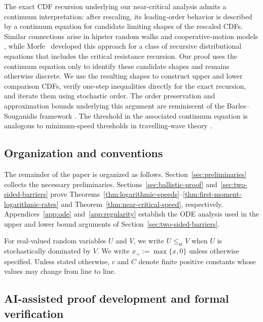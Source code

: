 \documentclass[12pt]{amsart}
\numberwithin{equation}{section}
\theoremstyle{plain}
\theoremstyle{definition}
\newcommand{\stle}{\le_{\mathrm{st}}}
\begin{document}
The exact CDF recursion underlying our near-critical analysis admits a
continuum interpretation: after rescaling, its leading-order behavior is
described by a continuum equation for candidate limiting shapes of the
rescaled CDFs.  Similar connections arise in hipster random walks and
cooperative-motion models
\cite{AddarioBerryEtAl2020,AddarioBerryBeckmanLin2022,
AddarioBerryBeckmanLin2024}, while Morfe~\cite{Morfe2026} developed this
approach for a class of recursive distributional equations that includes the
critical resistance recursion.  Our proof uses
the continuum equation
only to identify these candidate shapes and remains otherwise discrete.  We
use the resulting shapes to construct upper and lower comparison CDFs, verify
one-step inequalities directly for the exact recursion, and iterate them
using stochastic order.  The order preservation and approximation bounds
underlying this argument are reminiscent of the Barles--Souganidis framework
\cite{BarlesSouganidis1991}.  The threshold in the associated continuum
equation is analogous to minimum-speed thresholds in travelling-wave theory
\cite{HadelerRothe1975,SanchezGardunoMaini1994}.

\subsection{Organization and conventions}
\label{sec:organization-conventions}

The remainder of the paper is organized as follows.
Section~\ref{sec:preliminaries} collects the necessary preliminaries.
Sections~\ref{sec:ballistic-proof}
and~\ref{sec:two-sided-barriers} prove
Theorems~\ref{thm:logarithmic-speeds}--\ref{thm:first-moment-logarithmic-rates}
and Theorem~\ref{thm:near-critical-speed}, respectively.
Appendices~\ref{app:ode} and~\ref{app:regularity} establish the
ODE analysis used in the upper and lower bound arguments of Section~\ref{sec:two-sided-barriers}.

For real-valued random variables $U$ and $V$, we write
$U\stle V$ when $U$ is stochastically dominated by $V$.  We write
$x_+:=\max\{x,0\}$ unless otherwise specified. Unless stated otherwise,
$c$ and $C$ denote finite
positive constants whose values may change from line to line.

\subsection{AI-assisted proof development and formal verification}
\label{subsec:ai-methodology}
\end{document}
